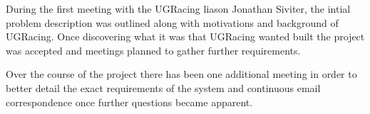 During the first meeting with the UGRacing liason Jonathan Siviter, the intial problem description was outlined along with motivations and background of UGRacing. Once discovering what it was that UGRacing wanted built the project was accepted and meetings planned to gather further requirements. 


Over the course of the project there has been one additional meeting in order to better detail the exact requirements of the system and continuous email correspondence once further questions became apparent.
